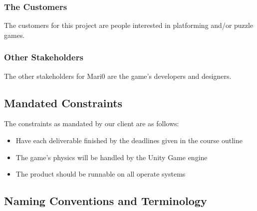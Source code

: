 \documentclass[12pt, titlepage]{article}
\begin{document}
\subsubsection{The Customers}
The customers for this project are people interested in platforming and/or puzzle games.

\subsubsection{Other Stakeholders}
The other stakeholders for Mari0 are the game's developers and designers.

\subsection{Mandated Constraints}
The constraints as mandated by our client are as follows:
\begin{itemize}
	\item Have each deliverable finished by the deadlines given in the course outline
	\item The game's physics will be handled by the Unity Game engine
	\item The product should be runnable on all operate systems
\end{itemize}

\subsection{Naming Conventions and Terminology}
\end{document}
